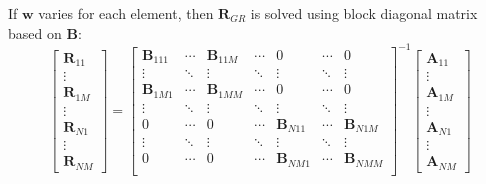\documentclass[12pt]{iopart}
\newcommand{\wB}{\mbox{$\mathbf{w}$}}
\newcommand{\AB}{\mbox{$\mathbf{A}$}}
\newcommand{\BB}{\mbox{$\mathbf{B}$}}
\newcommand{\RB}{\mbox{$\mathbf{R}$}}
\begin{document}
If $\wB$ varies for each element, then $\RB_{GR}$ is
solved using block diagonal matrix based on $\BB$:
\begin{equation}
\left[ \begin{array}{l}
\RB_{11} \\
\vdots \\
\RB_{1M} \\
\vdots \\
\RB_{N1} \\
\vdots \\
\RB_{NM}
\end{array} \right]
 =
\left[ \begin{array}{lllllll}
\BB_{111} & \cdots & \BB_{11M} & \cdots & 0         & \cdots  & 0  \\
\vdots    & \ddots & \vdots    & \ddots & \vdots    & \ddots  & \vdots \\  
\BB_{1M1} & \cdots & \BB_{1MM} & \cdots & 0         & \cdots  & 0  \\
\vdots    & \ddots & \vdots    & \ddots & \vdots    & \ddots  & \vdots \\  
0         & \cdots & 0         & \cdots & \BB_{N11} & \cdots  & \BB_{N1M}  \\
\vdots    & \ddots & \vdots    & \ddots & \vdots    & \ddots  & \vdots \\  
0         & \cdots & 0         & \cdots & \BB_{NM1} & \cdots  & \BB_{NMM}  \\
\end{array} \right]^{-1}
\left[ \begin{array}{l}
\AB_{11} \\
\vdots \\
\AB_{1M} \\
\vdots \\
\AB_{N1} \\
\vdots \\
\AB_{NM}
\end{array} \right]
\end{equation}
\end{document}
